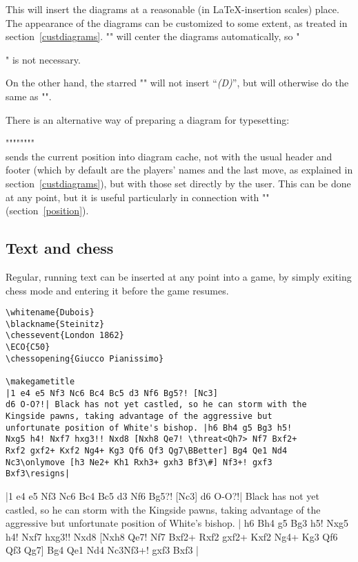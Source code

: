 \documentclass[12pt]{ltxdoc}
\begin{document}
This will insert the diagrams at a reasonable (in \LaTeX-insertion scales) place. The appearance of the diagrams can be customized to some extent, as treated in section~\ref{custdiagrams}. "\makediagrams" will center the diagrams automatically, so "\begin{center}" is not necessary.

On the other hand, the starred \DescribeMacro{\toD*}"\toD*" will not insert ``\textit{(D)}'', but will otherwise do the same as "\toD".

\bigskip\noindent
\DescribeMacro{\preparediagram}There is an alternative way of preparing a diagram for typesetting:

"\preparediagram""{""}{""}"\\
sends the current position into diagram cache, not with the usual header and footer (which by default are the players' names and the last move, as explained in section~\ref{custdiagrams}), but with those set directly by the user. This can be done at any point, but it is useful particularly in connection with "\position" (section~\ref{position}).


\subsection{Text and chess}\label{text}

Regular, running text can be inserted at any point into a game, by simply exiting chess mode and entering it before the game resumes.

\makebarother
\begin{verbatim}
\whitename{Dubois}
\blackname{Steinitz}
\chessevent{London 1862}
\ECO{C50}
\chessopening{Giucco Pianissimo}

\makegametitle
|1 e4 e5 Nf3 Nc6 Bc4 Bc5 d3 Nf6 Bg5?! [Nc3] 
d6 O-O?!| Black has not yet castled, so he can storm with the 
Kingside pawns, taking advantage of the aggressive but 
unfortunate position of White's bishop. |h6 Bh4 g5 Bg3 h5! 
Nxg5 h4! Nxf7 hxg3!! Nxd8 [Nxh8 Qe7! \threat<Qh7> Nf7 Bxf2+ 
Rxf2 gxf2+ Kxf2 Ng4+ Kg3 Qf6 Qf3 Qg7\BBetter] Bg4 Qe1 Nd4 
Nc3\onlymove [h3 Ne2+ Kh1 Rxh3+ gxh3 Bf3\#] Nf3+! gxf3 
Bxf3\resigns|
\end{verbatim}


\makebarchess
{}

\makegametitle
|1 e4 e5 Nf3 Nc6 Bc4 Bc5 d3 Nf6 Bg5?! [Nc3] d6 O-O?!| Black has not yet castled, so he can storm with the Kingside pawns, taking advantage of the aggressive but unfortunate position of White's bishop. | h6 Bh4 g5 Bg3 h5! Nxg5 h4! Nxf7 hxg3!! Nxd8 [Nxh8 Qe7!  Nf7 Bxf2+ Rxf2 gxf2+ Kxf2 Ng4+ Kg3 Qf6 Qf3 Qg7\BBetter] Bg4 Qe1 Nd4 Nc3 Nf3+! gxf3 Bxf3 \resigns|


\end{center}
\end{document}
